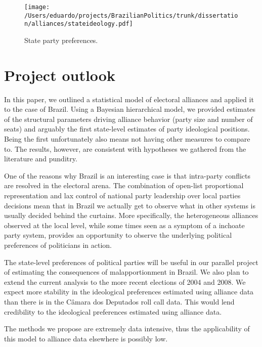 \begin{figure}
  \centering
  \texttt{[image: /Users/eduardo/projects/BrazilianPolitics/trunk/dissertation/alliances/stateideology.pdf]} 
  \caption{State party preferences. }
  \label{fig:stateideology}
\end{figure}


\section{Project outlook}
\label{sec:concl-proj-outl}

In this paper, we outlined a statistical model of electoral alliances and applied it to the case of Brazil. Using a Bayesian hierarchical model, we provided estimates of the structural parameters driving alliance behavior (party size and number of seats) and arguably the first state-level estimates of party ideological positions. Being the first unfortunately also means not having other measures to compare to. The results, however, are  consistent with hypotheses we gathered from the literature and punditry. 

One of the reasons why Brazil is an interesting case is that intra-party conflicts are resolved in the electoral arena. The combination of open-list proportional representation and lax control of national party leadership over local parties decisions mean that in Brazil we actually get to observe what in other systems is usually decided behind the curtains. More specifically, the heterogeneous  alliances observed at the local level, while some times seen as a symptom of a inchoate party system,  provides an opportunity to observe the underlying political preferences of politicians in action. 

The state-level preferences of political parties will be useful in our parallel project of estimating the consequences of malapportionment in Brazil. We also plan to extend the current analysis to the more recent elections of 2004 and 2008. We expect more stability in the ideological preferences estimated using alliance data than there is in the Câmara dos Deputados roll call data. This would lend credibility to the ideological preferences estimated using alliance data.

The methods we propose are extremely data intensive, thus the applicability  of this model to alliance data elsewhere is possibly low.   

%   

